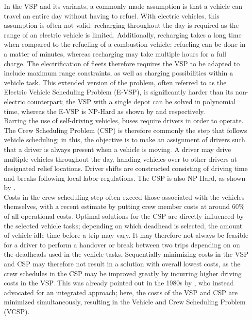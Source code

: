 \documentclass[]{article}
\begin{document}
In the VSP and its variants, a commonly made assumption is that a vehicle can travel an entire day without having to refuel. With electric vehicles, this assumption is often not valid: recharging throughout the day is required as the range of an electric vehicle is limited. Additionally, recharging takes a long time when compared to the refueling of a combustion vehicle: refueling can be done in a matter of minutes, whereas recharging may take multiple hours for a full charge. The electrification of fleets therefore requires the VSP to be adapted to include maximum range constraints, as well as charging possibilities within a vehicle task. This extended version of the problem, often referred to as the Electric Vehicle Scheduling Problem (E-VSP), is significantly harder than its non-electric counterpart; the VSP with a single depot can be solved in polynomial time, whereas the E-VSP is NP-Hard as shown by \citet{Bunte2009} and \citet{Sassi2014} respectively. \\
 Barring the use of self-driving vehicles, buses require drivers in order to operate. The Crew Scheduling Problem (CSP) is therefore commonly the step that follows vehicle scheduling; in this, the objective is to make an assignment of drivers such that a driver is always present when a vehicle is moving. A driver may drive multiple vehicles throughout the day, handing vehicles over to other drivers at designated relief locations. Driver shifts are constructed consisting of driving time and breaks following local labor regulations. The CSP is also NP-Hard, as shown by \citet{Fischetti1989}.\\
Costs in the crew scheduling step often exceed those associated with the vehicles themselves, with a recent estimate by \citet{Perumal2019Crew} putting crew member costs at around 60\% of all operational costs. Optimal solutions for the CSP are directly influenced by the selected vehicle tasks; depending on which deadhead is selected, the amount of vehicle idle time before a trip may vary. It may therefore not always be feasible for a driver to perform a handover or break between two trips depending on on the deadheads used in the vehicle tasks. Sequentially minimizing costs in the VSP and CSP may therefore not result in a solution with overall lowest costs, as the crew schedules in the CSP may be improved greatly by incurring higher driving costs in the VSP. This was already pointed out in the 1980s by \citet{Bodin1983}, who instead advocated for an integrated approach; here, the costs of the VSP and CSP are minimized simultaneously, resulting in the Vehicle and Crew Scheduling Problem (VCSP). \\
\end{document}
